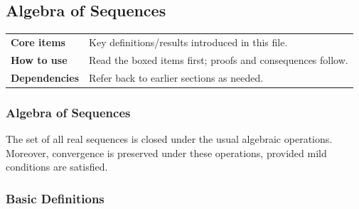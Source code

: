 
\subsection{Algebra of Sequences}

\begin{tcolorbox}[colback=gray!6, colframe=gray!40, arc=2pt,
  left=6pt, right=6pt, top=4pt, bottom=4pt,
  title={\small\textbf{Algebra Of Sequences — Quick Reference}},
  fonttitle=\small\bfseries]
\begin{tabular}{@{}p{}p{}@{}}
\textbf{Core items} & Key definitions/results introduced in this file.\\
\textbf{How to use} & Read the boxed items first; proofs and consequences follow.\\
\textbf{Dependencies} & Refer back to earlier sections as needed.\\
\end{tabular}
\end{tcolorbox}


\subsubsection{Algebra of Sequences}

The set of all real sequences is closed under the usual algebraic operations.
Moreover, convergence is preserved under these operations, provided mild
conditions are satisfied.

\subsubsection{Basic Definitions}

